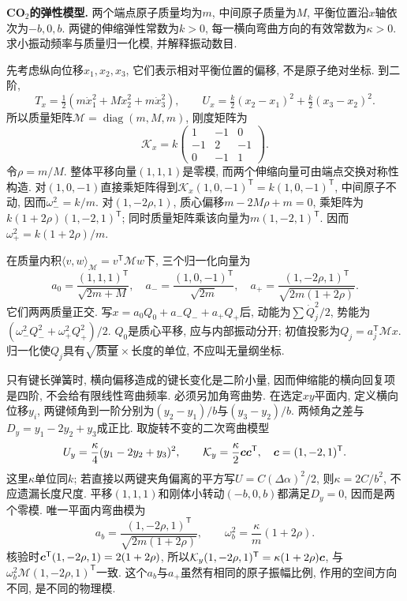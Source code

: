 \begin{example}
\textbf{CO$_2$的弹性模型.} 
两个端点原子质量均为$m$, 中间原子质量为$M$, 平衡位置沿$x$轴依次为$-b,0,b$. 两键的伸缩弹性常数为$k>0$, 每一横向弯曲方向的有效常数为$\kappa>0$. 求小振动频率与质量归一化模, 并解释振动数目.
\end{example}
\begin{solution}
先考虑纵向位移$x_1,x_2,x_3$, 它们表示相对平衡位置的偏移, 不是原子绝对坐标. 到二阶,
\[
T_x=\tfrac12(m\dot x_1^2+M\dot x_2^2+m\dot x_3^2),\qquad
U_x=\tfrac{k}{2}(x_2-x_1)^2+\tfrac{k}{2}(x_3-x_2)^2.
\]
所以质量矩阵$\mathcal M=\operatorname{diag}(m,M,m)$, 刚度矩阵为
\[
\mathcal K_x=k\begin{pmatrix}1&-1&0\\-1&2&-1\\0&-1&1\end{pmatrix}.
\]
令$\rho=m/M$. 整体平移向量$(1,1,1)$是零模, 而两个伸缩向量可由端点交换对称性构造. 对$(1,0,-1)$直接乘矩阵得到$\mathcal K_x(1,0,-1)^{\mathsf T}=k(1,0,-1)^{\mathsf T}$, 中间原子不动, 因而$\omega_-^2=k/m$. 对$(1,-2\rho,1)$, 质心偏移$m-2M\rho+m=0$, 乘矩阵为$k(1+2\rho)(1,-2,1)^{\mathsf T}$; 同时质量矩阵乘该向量为$m(1,-2,1)^{\mathsf T}$. 因而$\omega_+^2=k(1+2\rho)/m$.

在质量内积$\langle v,w\rangle_{\mathcal M}=v^{\mathsf T}\mathcal M w$下, 三个归一化向量为
\[
a_0=\frac{(1,1,1)^{\mathsf T}}{\sqrt{2m+M}},\quad
 a_- =\frac{(1,0,-1)^{\mathsf T}}{\sqrt{2m}},\quad
 a_+ =\frac{(1,-2\rho,1)^{\mathsf T}}{\sqrt{2m(1+2\rho)}}.
\]
它们两两质量正交. 写$x=a_0Q_0+a_-Q_-+a_+Q_+$后, 动能为$\sum\dot Q_j^2/2$, 势能为$(\omega_-^2Q_-^2+\omega_+^2Q_+^2)/2$. $Q_0$是质心平移, 应与内部振动分开; 初值投影为$Q_j=a_j^{\mathsf T}\mathcal M x$. 归一化使$Q_j$具有$\sqrt{\text{质量}}\times\text{长度}$的单位, 不应叫无量纲坐标.

只有键长弹簧时, 横向偏移造成的键长变化是二阶小量, 因而伸缩能的横向回复项是四阶, 不会给有限线性弯曲频率. 必须另加角弯曲势. 在选定$xy$平面内, 定义横向位移$y_i$, 两键倾角到一阶分别为$(y_2-y_1)/b$与$(y_3-y_2)/b$. 两倾角之差与
$D_y=y_1-2y_2+y_3$成正比. 取旋转不变的二次弯曲模型
\[
U_y=\frac{\kappa}{4}(y_1-2y_2+y_3)^2,\qquad
\mathcal K_y=\frac{\kappa}{2}\boldsymbol{c}\boldsymbol{c}^{\mathsf T},\quad
\boldsymbol{c}=(1,-2,1)^{\mathsf T}.
\]
这里$\kappa$单位同$k$; 若直接以两键夹角偏离的平方写$U=C(\Delta\alpha)^2/2$, 则$\kappa=2C/b^2$, 不应遗漏长度尺度. 平移$(1,1,1)$和刚体小转动$(-b,0,b)$都满足$D_y=0$, 因而是两个零模. 唯一平面内弯曲模为
\[
a_b=\frac{(1,-2\rho,1)^{\mathsf T}}{\sqrt{2m(1+2\rho)}},\qquad
\omega_b^2=\frac{\kappa}{m}(1+2\rho).
\]
核验时$\boldsymbol{c}^{\mathsf T}(1,-2\rho,1)=2(1+2\rho)$, 所以$\mathcal K_y(1,-2\rho,1)^{\mathsf T}=\kappa(1+2\rho)\boldsymbol{c}$, 与$\omega_b^2\mathcal M(1,-2\rho,1)^{\mathsf T}$一致. 这个$a_b$与$a_+$虽然有相同的原子振幅比例, 作用的空间方向不同, 是不同的物理模.


\end{solution}

